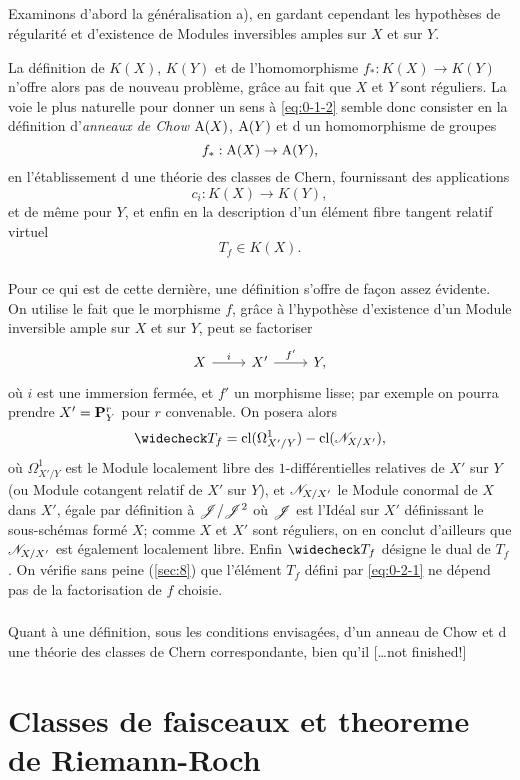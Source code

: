\section{}\label{sec:0-2}

Examinons d'abord la généralisation a), en gardant cependant les hypothèses de régularité et d'existence de Modules inversibles amples sur $X$ et sur $Y$. 

La définition de $K(X)$, $K(Y)$ et de l'homomorphisme $f_\ast:K(X)\to K(Y)$ n'offre alors pas de nouveau problème, grâce au fait que $X$ et $Y$ sont réguliers. La voie le plus naturelle pour donner un sens à \eqref{eq:0-1-2} semble donc consister en la définition d'\emph{anneaux de Chow} $\operatorname{A}(X)$, $\operatorname{A}(Y)$ et d un homomorphisme de groupes 
\[
  f_\ast:\operatorname{A}(X)\to \operatorname{A}(Y),
\]
en l'établissement d une théorie des classes de Chern, fournissant des applications 
\[
  c_i:K(X)\to K(Y),
\]
et de même pour $Y$, et enfin en la description d'un élément fibre tangent relatif virtuel 
\[
  T_f\in K(X) .
\]



\subsection{}

Pour ce qui est de cette dernière, une définition s'offre de façon assez évidente. On utilise le fait que le morphisme $f$, grâce à l'hypothèse d'existence d'un Module inversible ample sur $X$ et sur $Y$, peut se factoriser 
\begin{equation}\label{eq:0-2-1}
\begin{tikzcd}
  X \ar[r, "i"] 
    & X'\ar[r, "f'"]
    & Y ,
\end{tikzcd}
\end{equation}
où $i$ est une immersion fermée, et $f'$ un morphisme lisse; par exemple on pourra prendre $X'=\mathbf{P}_Y^r$ pour $r$ convenable. On posera alors 
\begin{equation}\label{eq:-0202}
  \widecheck T_f = \class(\Omega_{X'/Y}^1)-\class(\sN_{X/X'}),
\end{equation}
où $\Omega_{X'/Y}^1$ est le Module localement libre des $1$-différentielles relatives de $X'$ sur $Y$ (ou Module cotangent relatif de $X'$ sur $Y$), et $\mathscr{N}_{X/X'}$ le Module conormal de $X$ dans $X'$, égale par définition à $\mathscr{J}/\mathscr{J}^2$ où $\mathscr{J}$ est l'Idéal sur $X'$ définissant le sous-schémas formé $X$; comme $X$ et $X'$ sont réguliers, on en conclut d'ailleurs que $\mathscr{N}_{X/X'}$ est également localement libre. Enfin $\widecheck T_f$ désigne le dual de $T_f$. On vérifie sans peine (\ref{sec:8}) que l'élément $T_f$ défini par \eqref{eq:0-2-1} ne dépend pas de la factorisation de $f$ choisie. 




\subsection{} %

Quant à une définition, sous les conditions envisagées, d'un anneau de Chow et d une théorie des classes de Chern correspondante, bien qu'il
[\ldots not finished!]










\chapter*{Classes de faisceaux et theoreme de Riemann-Roch}